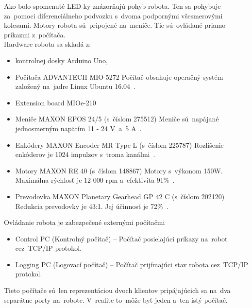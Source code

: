 \clearpage

Ako bolo spomenuté LED-ky znázorňujú pohyb robota. Ten sa pohybuje za~pomoci diferenciálneho podvozku s~dvoma
podpornými všesmerovými kolesami. Motory robota sú~pripojené na~meniče. Tie sú~ovládané priamo príkazmi z~počítača.\\

\noindent Hardware robota sa skladá z:
\begin{itemize}
	\item kontrolnej dosky Arduino Uno,

	\item Počítača ADVANTECH MIO-5272 \newline
		Počítač obsahuje operačný systém založený na~jadre Linux Ubuntu 16.04~\cite{robotPc}.

	\item Extension board MIOe-210~\cite{extensionModule}

	\item Meniče MAXON EPOS 24/5 (s~číslom 275512) \newline
	 	Meniče sú~napájané jednosmerným napätím 11 - 24 V~a~5 A~\cite{menic}.

	\item Enkódery MAXON Encoder MR Type L (s~číslom 225787) \newline
		Rozlíšenie enkóderov je 1024 impulzov s~troma kanálmi~\cite{encoder}.

	\item Motory MAXON RE 40 (s~číslom 148867) \newline
		Motory s~výkonom 150W. Maximálna rýchlosť je 12 000 rpm a~efektivita 91\%~\cite{motor}.

	\item Prevodovka MAXON Planetary Gearhead GP 42 C (s~číslom 202120) \newline
		Redukcia prevodovky je 43:1. Jej účinnosť je 72\%~\cite{prevodovka}.
\end{itemize}

\noindent Ovládanie robota je zabezpečené externými počítačmi
\begin{itemize}
	\item Control PC (Kontrolný počítač) -- Počítač posielajúci príkazy na~robot cez~TCP/IP protokol.
	\item Logging PC (Logovací počítač) -- Počítač prijímajúci stav robota cez~TCP/IP protokol.
\end{itemize}

\noindent Tieto počítače sú~len reprezentáciou dvoch klientov pripájajúcich sa na~dva separátne porty na~robote.
V~realite to~môže byť jeden a~ten istý počítač.

